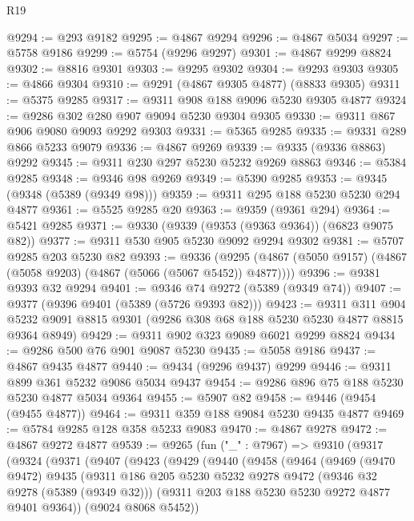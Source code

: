 \begin{lexlean}{R19}
\begin{coremodule}
@9294 := @293 @9182
@9295 := @4867 @9294
@9296 := @4867 @5034
@9297 := @5758 @9186
@9299 := @5754 (@9296 @9297)
@9301 := @4867 @9299 @8824
@9302 := @8816 @9301
@9303 := @9295 @9302
@9304 := @9293 @9303
@9305 := @4866 @9304
@9310 := @9291 (@4867 @9305 @4877) (@8833 @9305)
@9311 := @5375 @9285
@9317 := @9311 @908 @188 @9096 @5230 @9305 @4877
@9324 := @9286 @302 @280 @907 @9094 @5230 @9304 @9305
@9330 := @9311 @867 @906 @9080 @9093 @9292 @9303
@9331 := @5365 @9285
@9335 := @9331 @289 @866 @5233 @9079
@9336 := @4867 @9269
@9339 := @9335 (@9336 @8863) @9292
@9345 := @9311 @230 @297 @5230 @5232 @9269 @8863
@9346 := @5384 @9285
@9348 := @9346 @98 @9269
@9349 := @5390 @9285
@9353 := @9345 (@9348 (@5389 (@9349 @98)))
@9359 := @9311 @295 @188 @5230 @5230 @294 @4877
@9361 := @5525 @9285 @20
@9363 := @9359 (@9361 @294)
@9364 := @5421 @9285
@9371 := @9330 (@9339 (@9353 (@9363 @9364)) (@6823 @9075 @82))
@9377 := @9311 @530 @905 @5230 @9092 @9294 @9302
@9381 := @5707 @9285 @203 @5230 @82
@9393 := @9336
    (@9295 (@4867 (@5050 @9157) (@4867 (@5058 @9203) (@4867 (@5066 (@5067 @5452)) @4877))))
@9396 := @9381 @9393 @32 @9294
@9401 := @9346 @74 @9272 (@5389 (@9349 @74))
@9407 := @9377 (@9396 @9401 (@5389 (@5726 @9393 @82)))
@9423 := @9311
    @311
    @904
    @5232
    @9091
    @8815
    @9301
    (@9286 @308 @68 @188 @5230 @5230 @4877 @8815 @9364 @8949)
@9429 := @9311 @902 @323 @9089 @6021 @9299 @8824
@9434 := @9286 @500 @76 @901 @9087 @5230
@9435 := @5058 @9186
@9437 := @4867 @9435 @4877
@9440 := @9434 (@9296 @9437) @9299
@9446 := @9311 @899 @361 @5232 @9086 @5034 @9437
@9454 := @9286 @896 @75 @188 @5230 @5230 @4877 @5034 @9364
@9455 := @5907 @82
@9458 := @9446 (@9454 (@9455 @4877))
@9464 := @9311 @359 @188 @9084 @5230 @9435 @4877
@9469 := @5784 @9285 @128 @358 @5233 @9083
@9470 := @4867 @9278
@9472 := @4867 @9272 @4877
@9539 := @9265
    (fun ("_" : @7967) =>
    @9310
      (@9317
        (@9324
          (@9371
            (@9407
              (@9423
                (@9429
                  (@9440
                    (@9458
                      (@9464
                        (@9469
                          (@9470 @9472)
                          @9435
                          (@9311
                            @186
                            @205
                            @5230
                            @5232
                            @9278
                            @9472
                            (@9346 @32 @9278 (@5389 (@9349 @32)))
                            (@9311 @203 @188 @5230 @5230 @9272 @4877 @9401 @9364))
                          (@9024 @8068 @5452))

\end{coremodule}
\end{lexlean}
